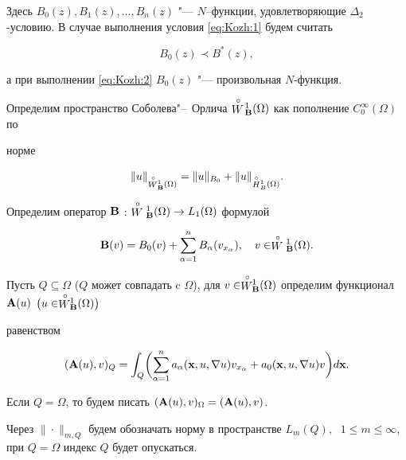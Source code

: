 Здесь $B_0(z),B_1(z),\dots,B_n(z)$ "--- $N$--функции, удовлетворяющие $\Delta_2$-условию. В случае выполнения условия \eqref{eq:Kozh:1} будем считать

$$

B_0(z)\prec B^*(z),

$$

а при выполнении \eqref{eq:Kozh:2} $B_0(z)$ "--- произвольная $N$-функция.



  Определим пространство Соболева"--~Орлича $\stackrel {\circ}

{W}\!_{\bf B}^{1}(\Omega)$ как пополнение $C_0^{\infty}(\Omega)$ по

норме

$$

\|u\|_{\stackrel {\circ}

{W}{}_{\bf B}^{1}(\Omega)}=\|u\|_{B_0}+\|u\|_{\stackrel {\circ}

{H}{}_{B}^1(\Omega)}.

$$

Определим оператор  ${\bf B}$ : $\stackrel {\circ}

{W}{}_{\bf B}^{1}(\Omega) \to  L_1(\Omega)$  формулой

$$

{\bf B}(v)=B_0(v)+\sum_{\alpha=1}^n B_\alpha(v_{x_{\alpha}}),\quad v\in\stackrel {\circ}

{W}{}_{\bf B}^{1}(\Omega).

$$

Пусть $Q\subseteq \Omega$ ($Q$ может совпадать c $\Omega$), для $v\in \stackrel {\circ}{W}\!\!_{{\bf B}}^{1}(\Omega)$ определим функционал ${\bf A}(u)$ $\bigl(u\in \stackrel {\circ}{W}\!\!_{{\bf B}}^{1}(\Omega)\bigr)$

  равенством

\begin{equation}

\label{eq:Kozh:A}

({\bf A}(u),v)_Q=\int_{Q}\biggl(\sum\limits_{\alpha=1}^{n}a_{\alpha}({\bf x},u,\nabla u)v_{x_{\alpha}}+a_0({\bf x},u,\nabla u)v\biggr)d{\bf x}.

\end{equation}

Если $Q=\Omega$, то будем писать $({\bf A}(u),v)_{\Omega}=({\bf A}(u),v)$.

Через $\|\cdot\|_{m,Q}$ будем обозначать норму в пространстве $L_m(Q),\;$ $1\leq m\leq \infty$, при  $Q=\Omega$ индекс $Q$ будет опускаться.



